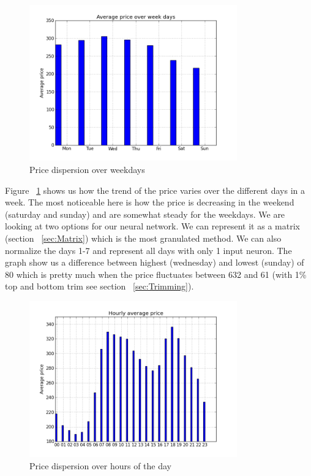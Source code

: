 \begin{figure}[H]
\centering
\includegraphics[width=0.8\textwidth ,natwidth=410,natheight=237]{billeder/energy_price_plots/Average_price_over_weekdays.png}
\caption{Price dispersion over weekdays}
\label{fig:price_over_weekdays}
\end{figure}

Figure ~\ref{fig:price_over_weekdays} shows us how the trend of the price varies over the different days in a week. The most noticeable here is how the price is decreasing in the weekend (saturday and sunday) and are somewhat steady for the weekdays. We are looking at two options for our neural network. We can represent it as a matrix (section ~\ref{sec:Matrix}) which is the most granulated method. We can also normalize the days 1-7 and represent all days with only 1 input neuron.
The graph show us a difference between highest (wednesday) and lowest (sunday) of 80 which is pretty much when the price fluctuates between 632 and 61 (with 1\% top and bottom trim see section ~\ref{sec:Trimming}).

\begin{figure}[H]
\centering
\includegraphics[width=0.8\textwidth ,natwidth=410,natheight=237]{billeder/energy_price_plots/price_per_hour.png}
\caption{Price dispersion over hours of the day}
\label{fig:price_per_hour}
\end{figure}

